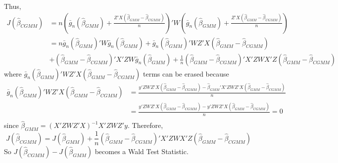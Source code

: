\documentclass[12pt]{article}
\theoremstyle{definition}
\theoremstyle{property}
\theoremstyle{assumption}
\theoremstyle{example}
\theoremstyle{comment}
\begin{document}
 Thus,
 \small{\[
 \begin{aligned}
 J(\hat{\beta}_{CGMM})&=n\left(\bar{g}_n(\hat{\beta}_{GMM})+\frac{Z'X(\hat{\beta}_{GMM}-\hat{\beta}_{CGMM})}{n}\right)'W\left(\bar{g}_n(\hat{\beta}_{GMM})+\frac{Z'X(\hat{\beta}_{GMM}-\hat{\beta}_{CGMM})}{n}\right)\\
 &=n\bar{g}_n(\hat{\beta}_{GMM})'W\bar{g}_n(\hat{\beta}_{GMM})+\bar{g}_n(\hat{\beta}_{GMM})'WZ'X(\hat{\beta}_{GMM}-\hat{\beta}_{CGMM})\\
 &+(\hat{\beta}_{GMM}-\hat{\beta}_{CGMM})'X'ZW\bar{g}_n(\hat{\beta}_{GMM})+\frac{1}{n}(\hat{\beta}_{GMM}-\hat{\beta}_{CGMM})'X'ZWX'Z(\hat{\beta}_{GMM}-\hat{\beta}_{CGMM})
 \end{aligned}
 \]}\normalsize
 where $\bar{g}_n(\hat{\beta}_{GMM})'WZ'X(\hat{\beta}_{GMM}-\hat{\beta}_{CGMM})$ terms can be erased because
 \footnotesize{\[
 \begin{aligned}
 \bar{g}_n(\hat{\beta}_{GMM})'WZ'X(\hat{\beta}_{GMM}-\hat{\beta}_{CGMM})&=\frac{y'ZWZ'X(\hat{\beta}_{GMM}-\hat{\beta}_{CGMM})-\hat{\beta}_{GMM}'X'ZWZ'X(\hat{\beta}_{GMM}-\hat{\beta}_{CGMM})}{n}\\
 &=\frac{y'ZWZ'X(\hat{\beta}_{GMM}-\hat{\beta}_{CGMM})-y'ZWZ'X(\hat{\beta}_{GMM}-\hat{\beta}_{CGMM})}{n}=0\\\
 \end{aligned}
 \]}\normalsize
since $\hat{\beta}_{GMM}=(X'ZWZ'X)^{-1}X'ZWZ'y$. Therefore, 
\[
J(\hat{\beta}_{CGMM})=J(\hat{\beta}_{GMM})+\frac{1}{n}(\hat{\beta}_{GMM}-\hat{\beta}_{CGMM})'X'ZWX'Z(\hat{\beta}_{GMM}-\hat{\beta}_{CGMM})
\]
So $J(\hat{\beta}_{CGMM})- J(\hat{\beta}_{GMM})$ becomes a Wald Test Statistic.
\end{document}

